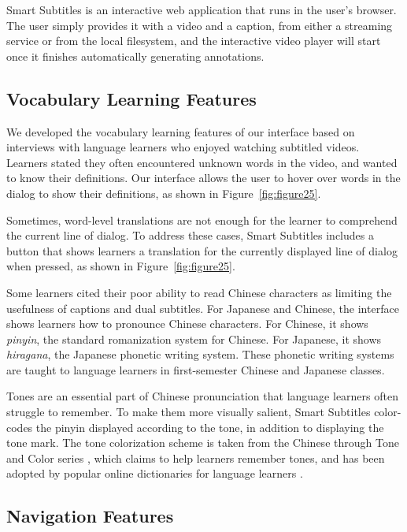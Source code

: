 \documentclass{sigchi}
\begin{document}
Smart Subtitles is an interactive web application that runs in the user's browser. The user simply provides it with a video and a caption, from either a streaming service or from the local filesystem,
and the interactive video player will start once it finishes automatically
generating annotations.

\pagebreak

\subsection{Vocabulary Learning Features}

We developed the vocabulary learning features of our interface based
on interviews with language learners who enjoyed watching subtitled videos. Learners stated they often encountered
unknown words in the video, and wanted to know their definitions.
Our interface allows the user to hover over words in
the dialog to show their definitions, as shown in Figure~\ref{fig:figure25}.

Sometimes, word-level translations are not enough for the learner to comprehend the current line of dialog. To address these cases, Smart Subtitles includes a button that shows learners a translation for the currently displayed line of dialog when pressed, as shown in Figure~\ref{fig:figure25}.

Some learners cited their poor ability to
read Chinese characters
as limiting the usefulness of captions and dual subtitles.
For Japanese and Chinese, the interface shows learners how to pronounce
Chinese characters. For Chinese, it shows \emph{pinyin}, the standard romanization system for Chinese. For Japanese, it shows \emph{hiragana}, the Japanese phonetic writing system. These phonetic writing systems are taught to
language learners in first-semester Chinese and Japanese classes.

Tones are an essential part of Chinese pronunciation that language learners often struggle to remember. To make them more visually salient, Smart Subtitles color-codes the pinyin displayed according to the tone, in addition to displaying the tone mark. The tone colorization scheme is taken from the Chinese through Tone and Color series \cite{tonecolor}, which claims to help learners remember tones, and has been adopted by popular online dictionaries for language learners \cite{mdbg}.

\subsection{Navigation Features}
\end{document}
